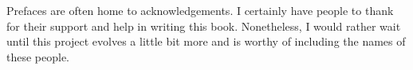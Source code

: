 \begin{para*}
Prefaces are often home to acknowledgements. I certainly have people to thank for their support and help in writing this book. Nonetheless, I would rather wait until this project evolves a little bit more and is worthy of including the names of these people.
\end{para*}
